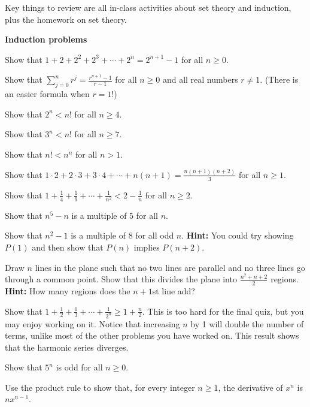 

Key things to review are all in-class activities about set theory and induction, plus the homework on set theory.

\vspace{0.2in}

\noindent
{\bf Induction problems}
\blist{0.2in}
\item Show that $1 + 2 + 2^2 + 2^3 + \cdots + 2^n = 2^{n+1} - 1$ for all $n \geq 0$.
\item Show that $\sum_{j=0}^n r^j = \frac{r^{n+1} - 1}{r-1}$ for all $n \geq 0$ and all real numbers $r \ne 1$.  (There is an easier formula when $r = 1!$)
\item Show that $2^n < n!$ for all $n \geq 4$.
\item Show that $3^n < n!$ for all $n \geq 7$.
\item Show that $n! < n^n$ for all $n > 1$.
\item Show that $1\cdot 2 + 2\cdot 3 +3 \cdot 4 + \cdots + n(n+1) = \frac{n(n+1)(n+2)}{3}$ for all $n \geq 1$.
\item Show that $1 + \frac{1}{4} + \frac{1}{9} + \cdots + \frac{1}{n^2} < 2-\frac{1}{n}$ for all $n \geq 2$.
\item Show that $n^5 - n$ is a multiple of 5 for all $n$.
\item Show that $n^2 - 1$ is a multiple of 8 for all odd $n$.
{\bf Hint:} You could try showing $P(1)$ and then show that $P(n)$ implies $P(n+2)$.
\item Draw $n$ lines in the plane such that no two lines are parallel and no three lines go through a common point.
Show that this divides the plane into $\frac{n^2+n+2}{2}$ regions.
{\bf Hint:} How many regions does the $n+1$st line add?
\item Show that $1 + \frac{1}{2} + \frac{1}{3} + \cdots + \frac{1}{2^n} \geq 1 + \frac{n}{2}$.  This is too hard for the final quiz, but you may enjoy working on it.  Notice that increasing $n$ by 1 will double the number of terms, unlike most of the other problems you have worked on.
This result shows that the harmonic series diverges.
\item Show that $5^n$ is odd for all $n \geq 0$.
\item Use the product rule to show that, for every integer $n \geq 1$, the derivative of $x^n$ is $n x^{n-1}$.
\elist

